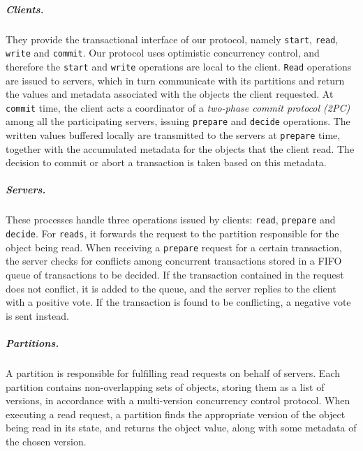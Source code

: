 \subparagraph{Clients.} They provide the transactional interface of our protocol, namely \texttt{start}, \texttt{read}, \texttt{write} and \texttt{commit}. Our protocol uses optimistic concurrency control, and therefore the \texttt{start} and \texttt{write} operations are local to the client. \texttt{Read} operations are issued to servers, which in turn communicate with its partitions and return the values and metadata associated with the objects the client requested. At \texttt{commit} time, the client acts a coordinator of a \emph{two-phase commit protocol (2PC)} among all the participating servers, issuing \texttt{prepare} and \texttt{decide} operations. The written values buffered locally are transmitted to the servers at \texttt{prepare} time, together with the accumulated metadata for the objects that the client read. The decision to commit or abort a transaction is taken based on this metadata.

\subparagraph{Servers.} These processes handle three operations issued by clients: \texttt{read}, \texttt{prepare} and \texttt{decide}. For \texttt{reads}, it forwards the request to the partition responsible for the object being read. When receiving a \texttt{prepare} request for a certain transaction, the server checks for conflicts among concurrent transactions stored in a FIFO queue of transactions to be decided. If the transaction contained in the request does not conflict, it is added to the queue, and the server replies to the client with a positive vote. If the transaction is found to be conflicting, a negative vote is sent instead.

\subparagraph{Partitions.} A partition is responsible for fulfilling read requests on behalf of servers. Each partition contains non-overlapping sets of objects, storing them as a list of versions, in accordance with a multi-version concurrency control protocol. When executing a read request, a partition finds the appropriate version of the object being read in its state, and returns the object value, along with some metadata of the chosen version.

